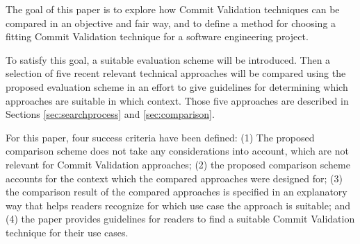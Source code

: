 The goal of this paper is to explore how Commit Validation techniques can be compared in an objective and fair way, and to define a method for choosing a fitting Commit Validation technique for a software engineering project.

To satisfy this goal, a suitable evaluation scheme will be introduced.
Then a selection of five recent relevant technical approaches will be compared using the proposed evaluation scheme in an effort to give guidelines for determining which approaches are suitable in which context. Those five approaches are described in Sections \ref{sec:searchprocess} and \ref{sec:comparison}.


For this paper, four success criteria have been defined: 
(1) The proposed comparison scheme does not take any considerations into account, which are not relevant for Commit Validation approaches;
(2) the proposed comparison scheme accounts for the context which the compared approaches were designed for;
(3) the comparison result of the compared approaches is specified in an explanatory way that helps readers recognize for which use case the approach is suitable; and %
(4) the paper provides guidelines for readers to find a suitable Commit Validation technique for their use cases.

